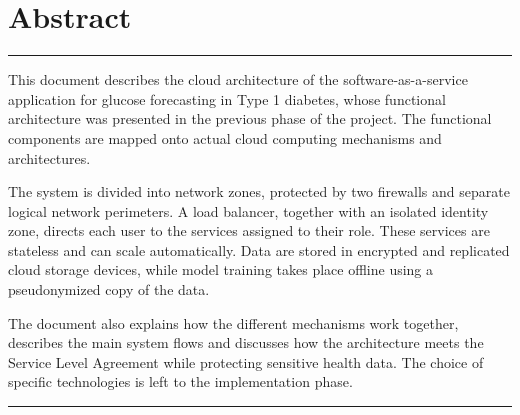 \chapter*{Abstract}
\thispagestyle{plain}

\begin{list}{}{%
    \setlength{\leftmargin}{1.5cm}%
    \setlength{\rightmargin}{1.5cm}%
    \setlength{\itemsep}{0pt}%
    \setlength{\parsep}{0.8em}%
    \setlength{\topsep}{0pt}}
\item[]
{\color{accent}\rule{\linewidth}{0.8pt}}

\vspace{0.6em}

This document describes the cloud architecture of the software-as-a-service application for glucose forecasting in Type 1 diabetes, whose functional architecture was presented in the previous phase of the project. The functional components are mapped onto actual cloud computing mechanisms and architectures.

The system is divided into network zones, protected by two firewalls and separate logical network perimeters. A load balancer, together with an isolated identity zone, directs each user to the services assigned to their role. These services are stateless and can scale automatically. Data are stored in encrypted and replicated cloud storage devices, while model training takes place offline using a pseudonymized copy of the data.

The document also explains how the different mechanisms work together, describes the main system flows and discusses how the architecture meets the Service Level Agreement while protecting sensitive health data. The choice of specific technologies is left to the implementation phase.

\vspace{0.4em}
{\color{accent}\rule{\linewidth}{0.8pt}}

\vspace{0.2em}


\end{list}
